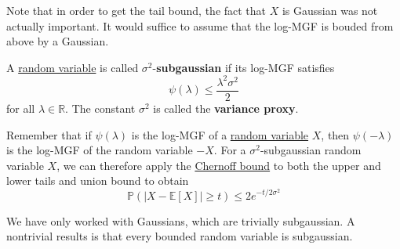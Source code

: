   Note that in order to get the tail bound, the fact that $X$ is Gaussian was not actually important. It would suffice to assume that the log-MGF is bouded from above by a Gaussian. 

  \begin{definition}
    \label{def:subgaussian-random-variables}
  A \hyperref[prob-def:random-variable]{random variable} is called $\sigma^2$-\textbf{subgaussian} if its log-MGF satisfies 
  \begin{equation}
    \psi(\lambda) \leq \frac{\lambda^2 \sigma^2}{2}
  \end{equation}
  for all $\lambda \in \mathbb{R}$. The constant $\sigma^2$ is called the \textbf{variance proxy}. 
  \end{definition}

  Remember that if $\psi(\lambda)$ is the log-MGF of a \hyperref[prob-def:random-variable]{random variable} $X$, then $\psi(-\lambda)$ is the log-MGF of the random variable $-X$. For a $\sigma^2$-subgaussian random variable $X$, we can therefore apply the \hyperref[thm:chernoff-bound]{Chernoff bound} to both the upper and lower tails and union bound to obtain 
  \begin{equation}
    \mathbb{P}(|X - \mathbb{E}[X]| \geq t ) \leq 2 e^{-t/2\sigma^2}
  \end{equation}

  We have only worked with Gaussians, which are trivially subgaussian. A nontrivial results is that every bounded random variable is subgaussian. 

